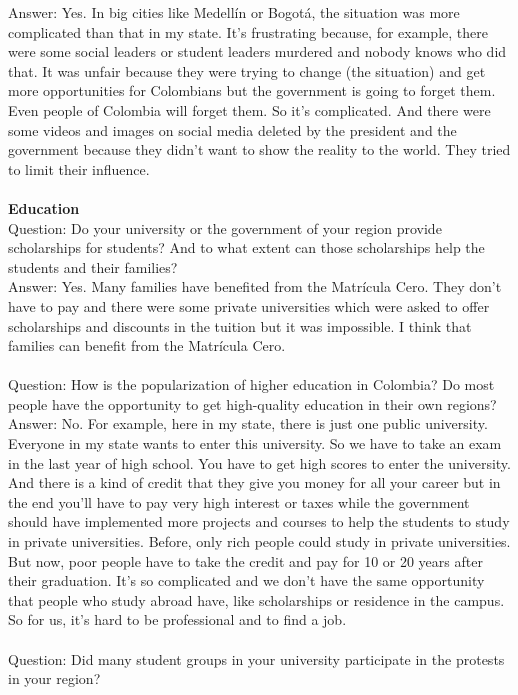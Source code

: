 \documentclass{phyasgn}\usepackage{nag}
\begin{document}
Answer: Yes. In big cities like Medellín or Bogotá, the situation was more complicated than that in my state. It’s frustrating because, for example, there were some social leaders or student leaders murdered and nobody knows who did that. It was unfair because they were trying to change (the situation) and get more opportunities for Colombians but the government is going to forget them. Even people of Colombia will forget them. So it’s complicated. And there were some videos and images on social media deleted by the president and the government because they didn’t want to show the reality to the world. They tried to limit their influence. \\
\\
\textbf{Education}\\
Question: Do your university or the government of your region provide scholarships for students? And to what extent can those scholarships help the students and their families?\\
Answer: Yes. Many families have benefited from the Matrícula Cero. They don’t have to pay and there were some private universities which were asked to offer scholarships and discounts in the tuition but it was impossible. I think that families can benefit from the Matrícula Cero.\\
\\
Question: How is the popularization of higher education in Colombia? Do most people have the opportunity to get high-quality education in their own regions?\\
Answer: No. For example, here in my state, there is just one public university. Everyone in my state wants to enter this university. So we have to take an exam in the last year of high school. You have to get high scores to enter the university. And there is a kind of credit that they give you money for all your career but in the end you’ll have to pay very high interest or taxes while the government should have implemented more projects and courses to help the students to study in private universities. Before, only rich people could study in private universities. But now, poor people have to take the credit and pay for 10 or 20 years after their graduation. It’s so complicated and we don’t have the same opportunity that people who study abroad have, like scholarships or residence in the campus. So for us, it’s hard to be professional and to find a job. \\
\\
Question: Did many student groups in your university participate in the protests in your region?\\
\end{document}
